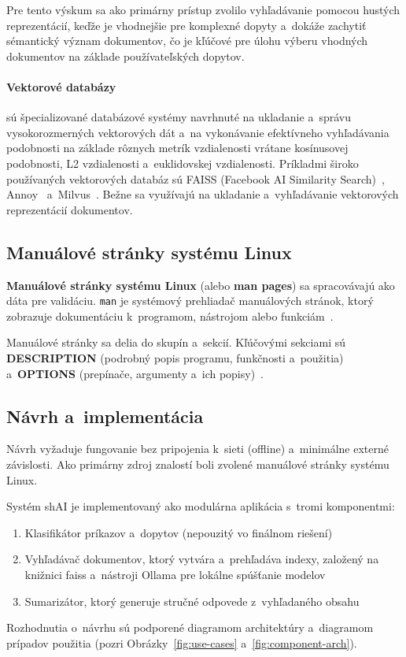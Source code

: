 Pre tento výskum sa ako primárny prístup zvolilo vyhľadávanie pomocou hustých reprezentácií, keďže je vhodnejšie pre komplexné dopyty a~dokáže zachytiť sémantický význam dokumentov, čo je kľúčové pre úlohu výberu vhodných dokumentov na základe používateľských dopytov.

\paragraph{Vektorové databázy} sú špecializované databázové systémy navrhnuté na ukladanie a~správu vysokorozmerných vektorových dát a~na vykonávanie efektívneho vyhľadávania podobnosti na základe rôznych metrík vzdialenosti vrátane kosínusovej podobnosti, L2 vzdialenosti a~euklidovskej vzdialenosti. Príkladmi široko používaných vektorových databáz sú FAISS (Facebook AI Similarity Search)~\cite{faiss2026}, Annoy~\cite{annoy2026} a~Milvus~\cite{milvus2026}. Bežne sa využívajú na ukladanie a~vyhľadávanie vektorových reprezentácií dokumentov.

\subsection*{Manuálové stránky systému Linux}

\textbf{Manuálové stránky systému Linux} (alebo \textbf{man pages}) sa spracovávajú ako dáta pre validáciu. \texttt{man} je systémový prehliadač manuálových stránok, ktorý zobrazuje dokumentáciu k~programom, nástrojom alebo funkciám~\cite{man_man}.

Manuálové stránky sa delia do skupín a~sekcií. Kľúčovými sekciami sú \textbf{DESCRIPTION} (podrobný popis programu, funkčnosti a~použitia) a~\textbf{OPTIONS} (prepínače, argumenty a~ich popisy)~\cite{man_man}.

\subsection*{Návrh a~implementácia}
Návrh vyžaduje fungovanie bez pripojenia k~sieti (offline) a~minimálne externé závislosti. Ako primárny zdroj znalostí boli zvolené manuálové stránky systému Linux.

Systém shAI je implementovaný ako modulárna aplikácia s~tromi komponentmi:
\begin{enumerate}
    \item Klasifikátor príkazov a~dopytov (nepouzitý vo finálnom riešení)
    \item Vyhľadávač dokumentov, ktorý vytvára a~prehľadáva indexy, založený na knižnici \gls{faiss} a~nástroji Ollama pre lokálne spúšťanie modelov
    \item Sumarizátor, ktorý generuje stručné odpovede z~vyhľadaného obsahu
\end{enumerate}
Rozhodnutia o~návrhu sú podporené diagramom architektúry a~diagramom prípadov použitia (pozri Obrázky~\ref{fig:use-cases} a~\ref{fig:component-arch}).

